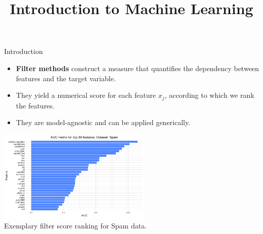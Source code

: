 \documentclass[11pt,compress,t,notes=noshow, xcolor=table]{beamer}
\title{Introduction to Machine Learning}
\date{}
\begin{document}

  \begin{vbframe}{Introduction}
  \vspace{0.4cm}
  \begin{itemize}
  \setlength{\itemsep}{0.8em}
    \item \textbf{Filter methods} construct a measure that quantifies the dependency between features and the target variable.
    \item They yield a numerical score for each feature $x_j$, according to which we rank the features.
    \item They are model-agnostic and can be applied generically.
  \end{itemize}
  \vspace{-0.2cm}
  \begin{center}
  \includegraphics[width=0.55\textwidth]{figure/fs-auc-barplot.png}\\
  \footnotesize{Exemplary filter score ranking for Spam data.}
  \end{center}
  
  \end{vbframe}
\end{document}
